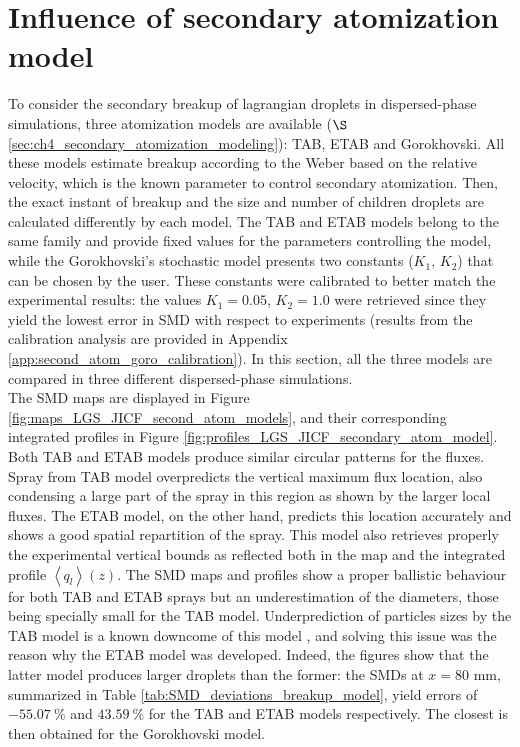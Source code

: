\section{Influence of secondary atomization model}
\label{sec:SLI_LGS_secondary_breakup_models}

To consider the secondary breakup of lagrangian droplets in dispersed-phase simulations, three atomization models are available ($\S$\ref{sec:ch4_secondary_atomization_modeling}): TAB, ETAB and Gorokhovski. All these models estimate breakup according to the Weber based on the relative velocity, which is the known parameter to control secondary atomization. Then, the exact instant of breakup and the size and number of children droplets are calculated differently by each model. The TAB and ETAB models belong to the same family and provide fixed values for the parameters controlling the model, while the Gorokhovski's stochastic model presents two constants ($K_1$, $K_2$) that can be chosen by the user. These constants were calibrated to better match the experimental results: the values  $K_1 = 0.05$, $K_2 = 1.0$ were retrieved since they yield the lowest error in SMD with respect to experiments (results from the calibration analysis are provided in Appendix \ref{app:second_atom_goro_calibration}). In this section, all the three models are compared in three different dispersed-phase simulations. \\

The SMD maps are displayed in Figure \ref{fig:maps_LGS_JICF_second_atom_models}, and their corresponding integrated profiles in Figure \ref{fig:profiles_LGS_JICF_secondary_atom_model}. Both TAB and ETAB models produce similar circular patterns for the fluxes. Spray from TAB model overpredicts the vertical maximum flux location, also condensing a large part of the spray in this region as shown by the larger local fluxes. The ETAB model, on the other hand, predicts this location accurately and shows a good spatial repartition of the spray. This model also retrieves properly the experimental vertical bounds as reflected both in the map and the integrated profile $\left\langle q_l \right\rangle \left( z \right)$. The SMD maps and profiles show a proper ballistic behaviour for both TAB and ETAB sprays but an underestimation of the diameters, those being specially small for the TAB model. Underprediction of particles sizes by the TAB model is a known downcome of this model , and solving this issue was the reason why the ETAB model was developed. Indeed, the figures show that the latter model produces larger droplets than the former: the SMDs at $x = 80$ mm, summarized in Table \ref{tab:SMD_deviations_breakup_model}, yield errors of $- 55.07~\%$ and $43.59~\%$ for the TAB and ETAB models respectively. The closest is then obtained for the Gorokhovski model.

